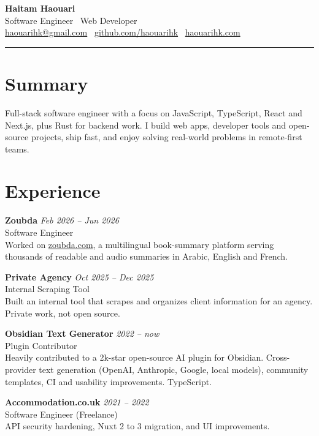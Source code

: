 \documentclass[10pt,a4paper]{article}
\newcommand{\head}[1]{{\section*{#1}}}
\begin{document}
\begin{center}
  {\LARGE\bfseries Haitam Haouari}\\[4pt]
  {\large Software Engineer \textperiodcentered\ Web Developer}\\[6pt]
  {\small
    \href{mailto:haouarihk@gmail.com}{haouarihk@gmail.com} \textperiodcentered\
    \href{https://github.com/haouarihk}{github.com/haouarihk} \textperiodcentered\
    \href{https://haouarihk.com}{haouarihk.com}
  }
\end{center}

\vspace{6pt}
\noindent\rule{\textwidth}{0.5pt}
\vspace{8pt}

\head{Summary}
Full-stack software engineer with a focus on JavaScript, TypeScript, React and Next.js, plus Rust for backend work. I build web apps, developer tools and open-source projects, ship fast, and enjoy solving real-world problems in remote-first teams.

\head{Experience}

\noindent\textbf{Zoubda} \hfill \textit{Feb 2026 -- Jun 2026}\\
Software Engineer\\
{\small Worked on \href{https://zoubda.com}{zoubda.com}, a multilingual book-summary platform serving thousands of readable and audio summaries in Arabic, English and French.}

\vspace{6pt}
\noindent\textbf{Private Agency} \hfill \textit{Oct 2025 -- Dec 2025}\\
Internal Scraping Tool\\
{\small Built an internal tool that scrapes and organizes client information for an agency. Private work, not open source.}

\vspace{6pt}
\noindent\textbf{Obsidian Text Generator} \hfill \textit{2022 -- now}\\
Plugin Contributor\\
{\small Heavily contributed to a 2k-star open-source AI plugin for Obsidian. Cross-provider text generation (OpenAI, Anthropic, Google, local models), community templates, CI and usability improvements. TypeScript.}

\vspace{6pt}
\noindent\textbf{Accommodation.co.uk} \hfill \textit{2021 -- 2022}\\
Software Engineer (Freelance)\\
{\small API security hardening, Nuxt 2 to 3 migration, and UI improvements.}
\end{document}
